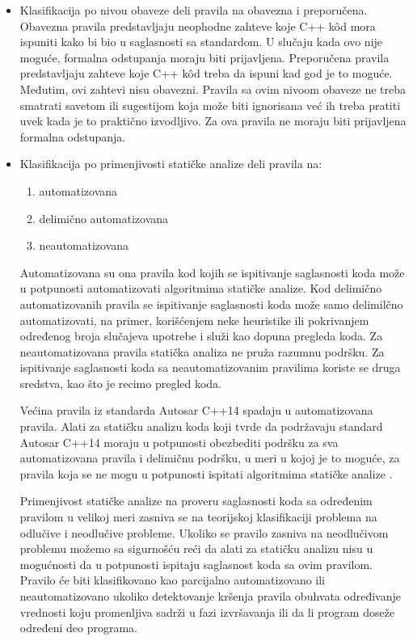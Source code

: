\documentclass[12pt,oneside]{memoir}
\begin{document}
\begin{itemize}
  \item{
Klasifikacija po nivou obaveze deli pravila na obavezna i preporučena.
Obavezna pravila predstavljaju neophodne zahteve koje C++ k\^{o}d mora ispuniti kako bi bio u saglasnosti sa standardom. U slučaju kada ovo nije moguće,
formalna odstupanja moraju biti prijavljena.
Preporučena pravila predstavljaju zahteve koje C++ k\^{o}d treba da ispuni kad god je to mogu\'{c}e. Međutim, ovi zahtevi nisu obavezni. Pravila
sa ovim nivoom obaveze ne treba smatrati savetom ili sugestijom koja može biti ignorisana ve\'{c} ih treba pratiti uvek kada je to prakti\v{c}no izvodljivo. Za ova pravila ne moraju biti prijavljena formalna odstupanja.}

  \item{
Klasifikacija po primenjivosti statičke analize deli pravila na: 
\begin{enumerate}
  \item{automatizovana}
  \item{delimično automatizovana}
  \item{neautomatizovana}
\end{enumerate}
Automatizovana su ona pravila kod kojih se ispitivanje saglasnosti koda može u potpunosti automatizovati algoritmima statičke analize.
Kod delimično automatizovanih pravila se ispitivanje saglasnosti koda može samo delimilčno automatizovati, na primer, korišćenjem neke heuristike ili pokrivanjem određenog broja slučajeva upotrebe i služi kao dopuna pregleda koda.
Za neautomatizovana pravila statička analiza ne pruža razumnu podršku. Za ispitivanje saglasnosti koda sa neautomatizovanim pravilima koriste se druga sredstva, kao što je recimo pregled koda.

\indent
Većina pravila iz standarda Autosar C++14 spadaju u automatizovana pravila. Alati za statičku analizu koda koji tvrde da podržavaju standard Autosar C++14 moraju u potpunosti obezbediti podršku za sva automatizovana pravila i delimičnu podršku, u meri u kojoj je to moguće, za pravila koja se ne mogu u potpunosti ispitati algoritmima statičke analize \cite{AutosarGuidelines}.

\indent
Primenjivost statičke analize na proveru saglasnosti koda sa određenim pravilom u velikoj meri zasniva se na teorijskoj klasifikaciji problema
na odlučive i neodlučive probleme. Ukoliko se pravilo zasniva na neodlučivom problemu možemo sa sigurnošću reći da alati za statičku analizu nisu u mogućnosti da u potpunosti ispitaju saglasnost koda sa ovim pravilom. Pravilo će biti klasifikovano kao parcijalno automatizovano ili neautomatizovano ukoliko detektovanje kršenja pravila obuhvata određivanje vrednosti koju promenljiva sadrži u fazi izvr\v{s}avanja ili da li program doseže određeni deo programa.

}
\end{itemize}
\end{document}
